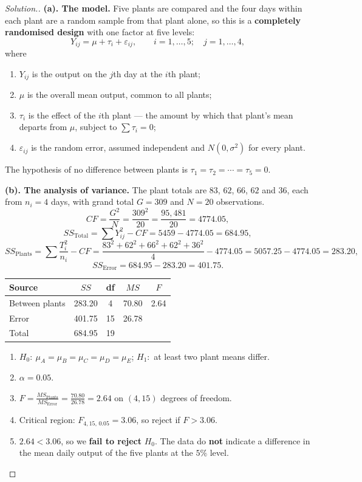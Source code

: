 \documentclass[11pt,a4paper]{article}
\theoremstyle{definition}
\newenvironment{solution}
  {\renewcommand{\qedsymbol}{}\begin{proof}[\textit{Solution}.]}
  {\end{proof}}
\begin{document}
\begin{solution}
\textbf{(a). The model.} Five plants are compared and the four days within each plant are a
random sample from that plant alone, so this is a \textbf{completely randomised design} with
one factor at five levels:
\[Y_{ij}=\mu+\tau_i+\varepsilon_{ij},\qquad i=1,\ldots,5;\quad j=1,\ldots,4,\]
where
\begin{enumerate}
\item[$\bullet$] $Y_{ij}$ is the output on the $j$th day at the $i$th plant;
\item[$\bullet$] $\mu$ is the overall mean output, common to all plants;
\item[$\bullet$] $\tau_i$ is the effect of the $i$th plant --- the amount by which that
plant's mean departs from $\mu$, subject to $\sum\tau_i=0$;
\item[$\bullet$] $\varepsilon_{ij}$ is the random error, assumed independent and
$N(0,\sigma^2)$ for every plant.
\end{enumerate}
The hypothesis of no difference between plants is $\tau_1=\tau_2=\cdots=\tau_5=0$.

\textbf{(b). The analysis of variance.} The plant totals are $83$, $62$, $66$, $62$ and
$36$, each from $n_i=4$ days, with grand total $G=309$ and $N=20$ observations.
\[CF=\frac{G^2}{N}=\frac{309^2}{20}=\frac{95{,}481}{20}=4774.05,\]
\[SS_{\text{Total}}=\sum Y_{ij}^2-CF=5459-4774.05=684.95,\]
\[SS_{\text{Plants}}=\sum\frac{T_i^2}{n_i}-CF
=\frac{83^2+62^2+66^2+62^2+36^2}{4}-4774.05=5057.25-4774.05=283.20,\]
\[SS_{\text{Error}}=684.95-283.20=401.75.\]
\begin{table}[H]
\centering
\begin{tabular}{lcccc}
Source & $SS$ & df & $MS$ & $F$\\
\hline
Between plants & 283.20 & 4 & 70.80 & 2.64\\
Error & 401.75 & 15 & 26.78 & \\
\hline
Total & 684.95 & 19 & & \\
\end{tabular}
\end{table}
\begin{enumerate}
\item $H_0:\ \mu_A=\mu_B=\mu_C=\mu_D=\mu_E$; $H_1:$ at least two plant means differ.
\item $\alpha=0.05$.
\item $F=\frac{MS_{\text{Plants}}}{MS_{\text{Error}}}=\frac{70.80}{26.78}=2.64$ on
$(4,15)$ degrees of freedom.
\item Critical region: $F_{4,15,\,0.05}=3.06$, so reject if $F>3.06$.
\item $2.64<3.06$, so we \textbf{fail to reject} $H_0$. The data do \textbf{not} indicate a
difference in the mean daily output of the five plants at the $5\%$ level.
\end{enumerate}


\end{solution}
\end{document}
